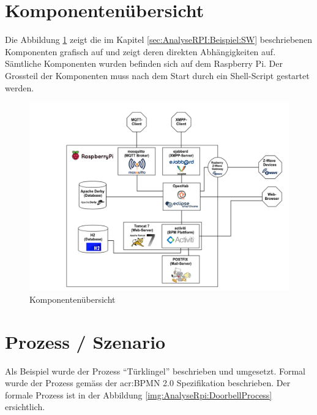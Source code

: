 \begin{itemize}

\end{itemize}


\section{Komponentenübersicht}
Die Abbildung \ref{img:AnalyseRpi:ComponentOverview}  zeigt die im Kapitel \ref{sec:AnalyseRPI:Beispiel:SW}  beschriebenen Komponenten grafisch auf und zeigt deren direkten Abhängigkeiten auf. Sämtliche Komponenten wurden befinden sich auf dem Raspberry Pi. Der Grossteil der Komponenten muss nach dem Start durch ein Shell-Script gestartet werden.

\begin{landscape}
\begin{figure}[H]
  \centering
  \includegraphics[width=19cm]{./images/Component-Overview}
  \caption{Komponentenübersicht}\label{img:AnalyseRpi:ComponentOverview}
\end{figure}
\end{landscape}

\section{Prozess / Szenario}
Als Beispiel wurde der Prozess "`Türklingel"' beschrieben und umgesetzt. Formal wurde der Prozess gemäss der \gls{acr:BPMN} 2.0 Spezifikation beschrieben. Der formale Prozess ist in der Abbildung \ref{img:AnalyseRpi:DoorbellProcess}  ersichtlich.

